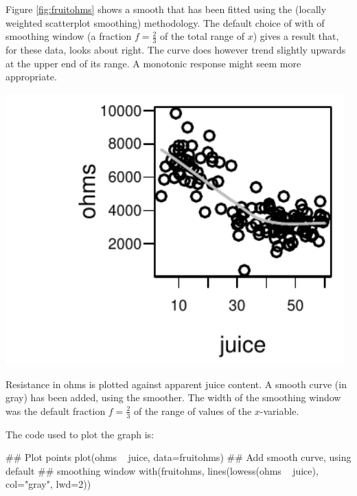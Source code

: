 Figure \ref{fig:fruitohms} shows a smooth that has been fitted using
the  (locally weighted scatterplot smoothing)
methodology.  The default choice of with of smoothing window (a fraction
$f = \frac{2}{3}$ of the total range of $x$) gives a result that,
for these data, looks about right. The curve does however trend
slightly upwards at the upper end of its range.  A monotonic
response might seem more appropriate.

\begin{marginfigure}
\begin{Schunk}


\centerline{\includegraphics[width=0.98\textwidth]{figs/12-smooth-ohms-1} }

\end{Schunk}
  \caption{Resistance in ohms is plotted against apparent juice
    content.  A smooth curve (in gray) has been added, using the
     smoother.  The width of the smoothing window was the
    default fraction $f = \frac{2}{3}$ of the range of values of the
    $x$-variable.}\label{fig:fruitohms}
\end{marginfigure}

The code used to plot the graph is:
\begin{Schunk}
\begin{Sinput}
## Plot points
plot(ohms ~ juice, data=fruitohms)
## Add smooth curve, using default
## smoothing window
with(fruitohms,
     lines(lowess(ohms ~ juice), col="gray", lwd=2))
\end{Sinput}
\end{Schunk}

